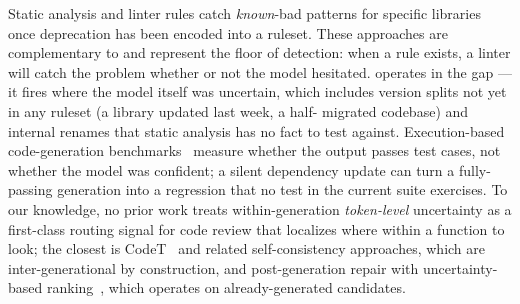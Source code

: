 Static analysis and linter rules catch \emph{known}-bad patterns for
specific libraries once deprecation has been encoded into a ruleset.
These approaches are complementary to \eps and represent the floor
of detection: when a rule exists, a linter will catch the problem
whether or not the model hesitated. \eps operates in the gap --- it
fires where the model itself was uncertain, which includes version
splits not yet in any ruleset (a library updated last week, a half-%
migrated codebase) and internal renames that static analysis has no
fact to test against. Execution-based code-generation
benchmarks~\cite{chen2021evaluating,austin2021program,%
jimenez2024swebench} measure whether the output passes test cases,
not whether the model was confident; a silent dependency update can
turn a fully-passing generation into a regression that no test in
the current suite exercises. To our knowledge, no prior work treats
within-generation \emph{token-level} uncertainty as a first-class
routing signal for code review that localizes where within a
function to look; the closest is CodeT~\cite{chen2022codet} and
related self-consistency approaches, which are inter-generational by
construction, and post-generation repair with uncertainty-based
ranking~\cite{ye2022selfapr}, which operates on already-generated
candidates.
